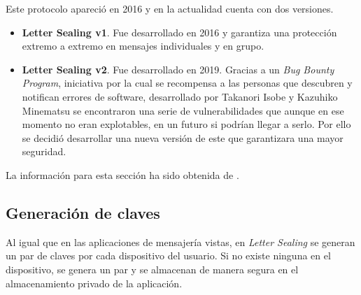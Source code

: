 Este protocolo apareció en 2016 y en la actualidad cuenta con dos versiones.
\begin{itemize}
	\item \textbf{Letter Sealing v1}. Fue desarrollado en 2016 y garantiza una protección extremo a extremo en mensajes individuales y en grupo.
	\item \textbf{Letter Sealing v2}. Fue desarrollado en 2019. Gracias a un \emph{Bug Bounty  Program}, iniciativa por la cual se recompensa a las personas que descubren y notifican errores de software,  desarrollado por Takanori Isobe y Kazuhiko Minematsu se encontraron una serie de vulnerabilidades que aunque en ese momento no eran explotables, en un futuro si podrían llegar a serlo. Por ello se decidió desarrollar una nueva versión de este que garantizara una mayor seguridad.
\end{itemize}
La información para esta sección ha sido obtenida de \cite{line}.
\begin{table}[htb]
	\label{table:lsv}
	\caption{Tabla comparativa de versiones de Letter Sealing.}
\end{table}

\subsection{Generación de claves}
Al igual que en las aplicaciones de mensajería vistas, en \emph{Letter Sealing} se generan un par de claves por cada dispositivo del usuario. Si no existe ninguna en el dispositivo, se genera un par y se almacenan de manera segura en el almacenamiento privado de la aplicación.

